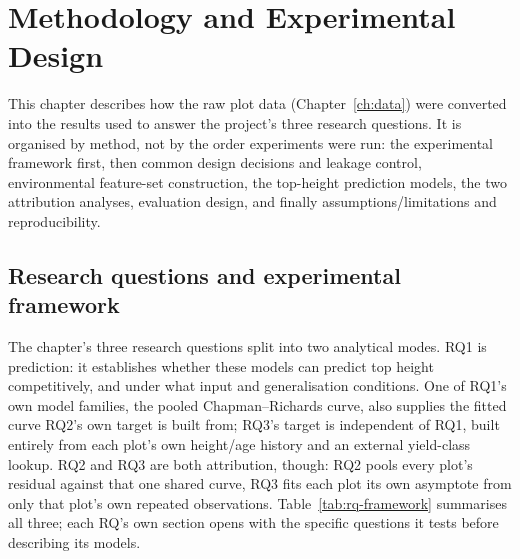 \documentclass[11pt,a4paper]{report}
\begin{document}

\chapter{Methodology and Experimental Design}
\label{ch:methodology}

This chapter describes how the raw plot data (Chapter~\ref{ch:data}) were converted into the
results used to answer the project's three research questions. It is organised by method, not by
the order experiments were run: the experimental framework first, then common design decisions and
leakage control, environmental feature-set construction, the top-height prediction models, the two
attribution analyses, evaluation design, and finally assumptions/limitations and reproducibility.

\section{Research questions and experimental framework}

The chapter's three research questions split into two analytical modes. RQ1 is prediction: it
establishes whether these models can predict top height competitively, and under what input and
generalisation conditions. One of RQ1's own model families, the pooled Chapman--Richards curve,
also supplies the fitted curve RQ2's own target is built from; RQ3's target is independent of RQ1,
built entirely from each plot's own height/age history and an external yield-class lookup. RQ2 and
RQ3 are both attribution, though: RQ2 pools every plot's residual against that one shared curve,
RQ3 fits each plot its own asymptote from only that plot's own repeated observations.
Table~\ref{tab:rq-framework} summarises all three; each RQ's own section opens with the specific
questions it tests before describing its models.
\end{document}
